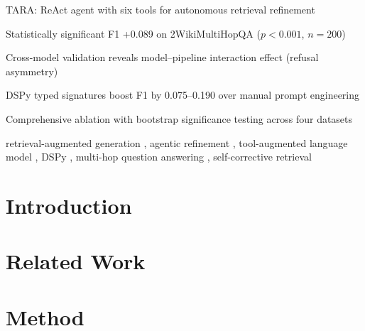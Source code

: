 \documentclass[preprint,review,number]{elsarticle}
\begin{document}
\begin{frontmatter}
\begin{highlights}
\item TARA: ReAct agent with six tools for autonomous retrieval refinement
\item Statistically significant F1 +0.089 on 2WikiMultiHopQA ($p < 0.001$, $n = 200$)
\item Cross-model validation reveals model--pipeline interaction effect (refusal asymmetry)
\item DSPy typed signatures boost F1 by 0.075--0.190 over manual prompt engineering
\item Comprehensive ablation with bootstrap significance testing across four datasets
\end{highlights}

\begin{keyword}
retrieval-augmented generation \sep
agentic refinement \sep
tool-augmented language model \sep
DSPy \sep
multi-hop question answering \sep
self-corrective retrieval
\end{keyword}

\end{frontmatter}

\section{Introduction}
\label{sec:introduction}



\section{Related Work}
\label{sec:related}



\section{Method}
\label{sec:method}



\end{document}
